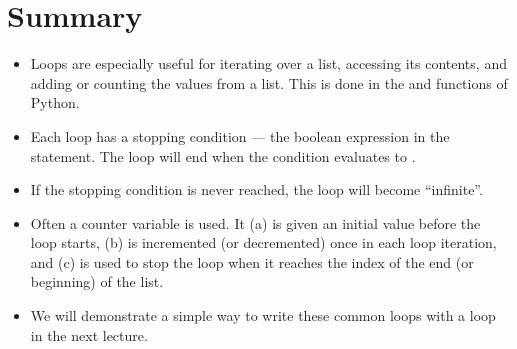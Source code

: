 \documentclass[letterpaper,10pt,english]{sphinxmanual}
\begin{document}
\section{Summary}
\label{\detokenize{lecture_notes/lec09_loops1_while:summary}}\begin{itemize}
\item {} 
Loops are especially useful for iterating over a list, accessing its
contents, and adding or counting the values from a list. This is
done in the  and  functions of Python.

\item {} 
Each loop has a stopping condition — the boolean expression in
the  statement.  The loop will end when the condition
evaluates to .

\item {} 
If the stopping condition is never reached, the loop will become
“infinite”.

\item {} 
Often a counter variable is used. It (a) is given an initial value
before the loop starts, (b) is incremented (or decremented) once in
each loop iteration, and (c) is used to stop the loop when it
reaches the index of the end (or beginning) of the list.

\item {} 
We will demonstrate a simple way to write these common loops with a
 loop in the next lecture.

\end{itemize}
\end{document}
